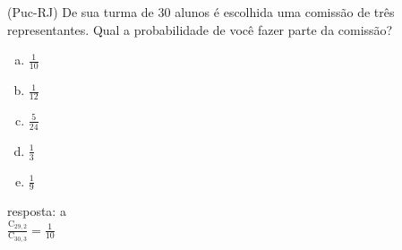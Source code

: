 \begin{ex}
 (Puc-RJ) De sua turma de 30 alunos é escolhida uma comissão de três representantes. Qual a probabilidade de você fazer parte da comissão?
    \begin{enumerate}[(a)]
    \item $\frac{1}{10}$
    \item $\frac{1}{12}$
    \item $\frac{5}{24}$
    \item $\frac{1}{3}$
    \item $\frac{1}{9}$
    \end{enumerate}
      \begin{sol}
       resposta: a \\
       $\frac{\mathrm{C}_{{29},2}}{\mathrm{C}_{{30},3}}= \frac{1}{10}$
      \end{sol}
\end{ex}